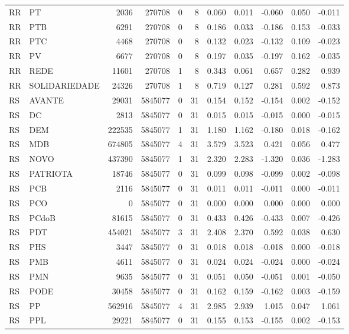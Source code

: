 \begin{landscape}
\begin{longtable}{llrrrrrrrrr}
RR & PT & 2036 & 270708 & 0 & 8 & 0.060 & 0.011 & -0.060 & 0.050 & -0.011 \\
RR & PTB & 6291 & 270708 & 0 & 8 & 0.186 & 0.033 & -0.186 & 0.153 & -0.033 \\
RR & PTC & 4468 & 270708 & 0 & 8 & 0.132 & 0.023 & -0.132 & 0.109 & -0.023 \\
RR & PV & 6677 & 270708 & 0 & 8 & 0.197 & 0.035 & -0.197 & 0.162 & -0.035 \\
RR & REDE & 11601 & 270708 & 1 & 8 & 0.343 & 0.061 & 0.657 & 0.282 & 0.939 \\
RR & SOLIDARIEDADE & 24326 & 270708 & 1 & 8 & 0.719 & 0.127 & 0.281 & 0.592 & 0.873 \\
RS & AVANTE & 29031 & 5845077 & 0 & 31 & 0.154 & 0.152 & -0.154 & 0.002 & -0.152 \\
RS & DC & 2813 & 5845077 & 0 & 31 & 0.015 & 0.015 & -0.015 & 0.000 & -0.015 \\
RS & DEM & 222535 & 5845077 & 1 & 31 & 1.180 & 1.162 & -0.180 & 0.018 & -0.162 \\
RS & MDB & 674805 & 5845077 & 4 & 31 & 3.579 & 3.523 & 0.421 & 0.056 & 0.477 \\
RS & NOVO & 437390 & 5845077 & 1 & 31 & 2.320 & 2.283 & -1.320 & 0.036 & -1.283 \\
RS & PATRIOTA & 18746 & 5845077 & 0 & 31 & 0.099 & 0.098 & -0.099 & 0.002 & -0.098 \\
RS & PCB & 2116 & 5845077 & 0 & 31 & 0.011 & 0.011 & -0.011 & 0.000 & -0.011 \\
RS & PCO & 0 & 5845077 & 0 & 31 & 0.000 & 0.000 & 0.000 & 0.000 & 0.000 \\
RS & PCdoB & 81615 & 5845077 & 0 & 31 & 0.433 & 0.426 & -0.433 & 0.007 & -0.426 \\
RS & PDT & 454021 & 5845077 & 3 & 31 & 2.408 & 2.370 & 0.592 & 0.038 & 0.630 \\
RS & PHS & 3447 & 5845077 & 0 & 31 & 0.018 & 0.018 & -0.018 & 0.000 & -0.018 \\
RS & PMB & 4611 & 5845077 & 0 & 31 & 0.024 & 0.024 & -0.024 & 0.000 & -0.024 \\
RS & PMN & 9635 & 5845077 & 0 & 31 & 0.051 & 0.050 & -0.051 & 0.001 & -0.050 \\
RS & PODE & 30458 & 5845077 & 0 & 31 & 0.162 & 0.159 & -0.162 & 0.003 & -0.159 \\
RS & PP & 562916 & 5845077 & 4 & 31 & 2.985 & 2.939 & 1.015 & 0.047 & 1.061 \\
RS & PPL & 29221 & 5845077 & 0 & 31 & 0.155 & 0.153 & -0.155 & 0.002 & -0.153 \\

\end{longtable}
\end{landscape}
